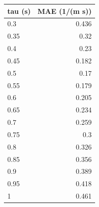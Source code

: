 \begin{tabular}{lr}
\toprule
tau (s) & MAE (1/(m s)) \\
\midrule
0.3 & 0.436 \\
0.35 & 0.32 \\
0.4 & 0.23 \\
0.45 & 0.182 \\
0.5 & 0.17 \\
0.55 & 0.179 \\
0.6 & 0.205 \\
0.65 & 0.234 \\
0.7 & 0.259 \\
0.75 & 0.3 \\
0.8 & 0.326 \\
0.85 & 0.356 \\
0.9 & 0.389 \\
0.95 & 0.418 \\
1 & 0.461 \\
\bottomrule
\end{tabular}
